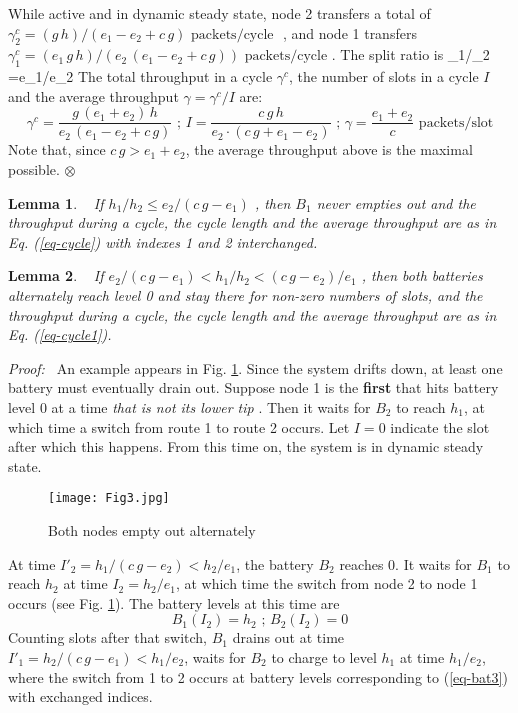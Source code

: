 \documentclass[12 pt]{article}
\newcommand{\debug}[1]{\mbox{\tt #1}}
\renewcommand{\debug}[1]{}              \newcommand{\cmd}[1]{}
\newcommand{\daddcontentsline}[3]{\addcontentsline{#1}{#2}{#3}}
\newcommand{\2}{\>\>}
\newcommand{\3}{\>\>\>}
\newcommand{\4}{\>\>\>\>}
\newcommand{\5}{\>\>\>\>\>}
\newcommand{\6}{\>\>\>\>\>\>}
\newcommand{\7}{\6\>}
\newcommand{\8}{\6\2}
\newcommand{\LB}[1]{\renewcommand{\tname}{\sname #1}\daddcontentsline{lot}{table}{\debug{Lemma \thelemma
	\fbox{\sname #1}}}\begin{lemma}\slabelx{#1}\cmd{LB} \  }
\newcommand{\LE}{\end{lemma} \cmd{ LE } }
\newcommand{\PB}{{\em Proof:\/\ }\cmd{ PB} }
\newcommand{\EB}{\begin{equation}\cmd{EB}}
\newcommand{\EE}[1]{ \debug{\fbox{\sname #1}}\label{\sname #1} \end{equation}\cmd{EE} }
\newcommand{\sname}{}
\newcommand{\tname}{}
\newcommand{\dref}[1]{\ref{#1}\debug{[#1]}\cmd{dref}}
\newcommand{\slabelx}[1]{\debug{\fbox{\tiny \sname #1}}\label{\sname #1}}
\newcounter{protblock}
\newcounter{line}[protblock]
\newtheorem{lemma}{Lemma}
\begin{document}
While active and in dynamic steady state, node 2 transfers a total of
$\gamma^c_2 = (g\,h)/(e_1 - e_2 + c\,g)\text{    packets/cycle } $ , and node 1 transfers
$\gamma^c_1 = (e_1\, g\,h)/ (e_2\,(e_1 - e_2 + c\,g))\text{    packets/cycle } $.  The split ratio is
\SB
\gamma_1/\gamma_2 =e_1/e_2
\SE
The total throughput in a cycle $\gamma^c$, the number of slots in a cycle $I$ and the average throughput $\gamma = \gamma^c/I$ are:
\EB
\gamma^c = \frac{g\,(e_1+e_2)\,h}{e_2\,(e_1-e_2+c\,g)}\text {   ;   }
I = \frac{c\,g\,h}{e_2\cdot(c\,g + e_1 - e_2)}\text{   ;    }
\gamma = \frac{e_1+e_2}{c} \text{     packets/slot}
\EE{eq-cycle}
Note that, since $c\,g > e_1 + e_2$, the average throughput above is the maximal possible.
$\otimes$


\LB{lemma-2}
If $h_1/h_2 \leq e_2/(c\,g - e_1)$  , then $B_1$ never empties out and the throughput during a cycle, the cycle length and the average throughput are as in Eq. (\dref{eq-cycle}) with indexes 1 and 2 interchanged.
\LE


\LB{lemma-1}
If  $ e_2/(c\,g - e_1) < h_1/h_2 < (c\,g-e_2)/e_1$ , then both batteries alternately reach level 0 and stay there for non-zero numbers of slots, and the throughput during a cycle, the cycle length and the average throughput are as in Eq. (\dref{eq-cycle1}).
\LE

\PB
An example appears in Fig. \dref{fig-case2}.
Since the system drifts down, at least one battery must eventually drain out.  Suppose node 1 is the \textbf{first} that hits battery level 0 at a time \emph{that is not its lower tip} .  Then it waits for $B_2$ to reach $h_1$, at which time a switch from route 1 to route 2 occurs.  Let $I=0$ indicate the slot after which this happens.  From this time on, the system is in dynamic steady state.

\begin{figure}[hbtp]
\begin{center}
\texttt{[image: Fig3.jpg]}
\caption{Both nodes empty out alternately\debug{\fbox{fig-case2}}\label{fig-case2}}
\end{center}
\end{figure}

At time $I'_2 = h_1/(c\,g -e_2)<h_2/e_1$, the battery $B_2$ reaches 0.  It waits for $B_1$ to reach $h_2$ at time $I_2= h_2/e_1$, at which time the switch from node 2 to node 1 occurs (see Fig. \dref{fig-case2}).  The battery levels at this time are
\EB
B_1(I_2) = h_2\text{      ;      } B_2(I_2) =  0
\EE{eq-bat3}
Counting slots after that switch, $B_1$ drains out at time $I'_1=  h_2/(c\,g - e_1)<h_1/e_2$, waits for $B_2$ to charge to level $h_1$ at time $h_1/e_2$, where the switch from 1 to 2 occurs at battery levels corresponding to (\dref{eq-bat3}) with  exchanged indices.
\end{document}
